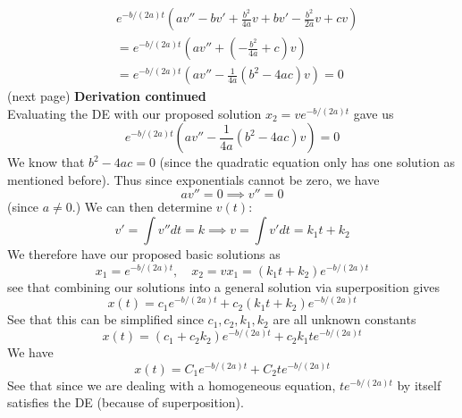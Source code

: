 \documentclass{report}
\begin{document}
\begin{align*}
&e^{-b/(2a)t}\left(av''-bv'+\frac{b^2}{4a}v+bv'-\frac{b^2}{2a}v+cv\right)\\
&=e^{-b/(2a)t}\left(av''+\left(-\frac{b^2}{4a}+c\right)v\right)\\
&=e^{-b/(2a)t}\left(av''-\frac{1}{4a}\left(b^2-4ac\right)v\right)=0
\end{align*}
(next page)
\newpage
\noindent\textbf{Derivation continued}\\ 
Evaluating the DE with our proposed solution $x_2=ve^{-b/(2a)t}$ gave us
\begin{equation*}
e^{-b/(2a)t}\left(av''-\frac{1}{4a}\left(b^2-4ac\right)v\right)=0
\end{equation*}
We know that $b^2-4ac=0$ (since the quadratic equation only has one solution as mentioned before). Thus since
exponentials cannot be zero, we have 
\begin{equation*}
av''=0\implies v''=0
\end{equation*}
(since $a\neq0$.) We can then determine $v(t)$:
\begin{equation*}
v'=\int v''dt=k\implies v=\int v'dt=k_1t+k_2
\end{equation*}
We therefore have our proposed basic solutions as
\begin{equation*}
x_1=e^{-b/(2a)t},\quad x_2=vx_1=(k_1t+k_2)e^{-b/(2a)t}
\end{equation*}
see that combining our solutions into a general solution via superposition gives
\begin{equation*}
x(t)=c_1e^{-b/(2a)t}+c_2(k_1t+k_2)e^{-b/(2a)t}
\end{equation*}
See that this can be simplified since $c_1,c_2,k_1,k_2$ are all unknown constants
\begin{equation*}
x(t)=(c_1+c_2k_2)e^{-b/(2a)t}+c_2k_1te^{-b/(2a)t}
\end{equation*}
We have
\begin{equation*}
x(t)=C_1e^{-b/(2a)t}+C_2te^{-b/(2a)t}
\end{equation*}
See that since we are dealing with a homogeneous equation,
$te^{-b/(2a)t}$ by itself satisfies the DE (because of superposition).
\newpage
\end{document}
